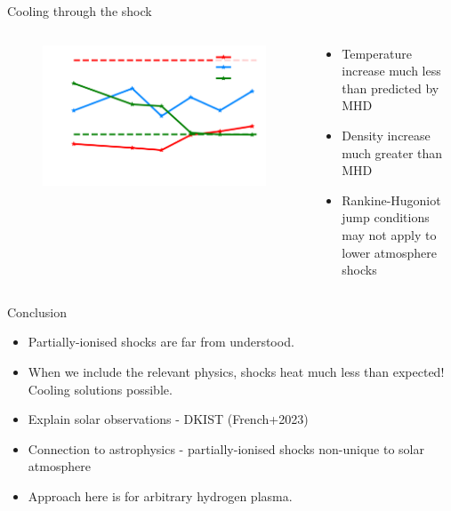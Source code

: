 \documentclass[10pt,aspectratio=169,usenames,dvipsnames]{beamer}
\begin{document}
\begin{frame}{Cooling through the shock}
\begin{columns}
\begin{column}{0.5\textwidth}
\begin{figure}
    \centering
    \includegraphics[width=0.95\linewidth]{2023StAndrewsAstro/Figures/tcompcor_plot.png} \\
\end{figure}
\end{column}
\begin{column}{0.42\textwidth}
\begin{itemize}
    \item Temperature increase much less than predicted by MHD
    \item Density increase much greater than MHD
    \item Rankine-Hugoniot jump conditions may not apply to lower atmosphere shocks
\end{itemize}
\end{column}
\end{columns}
\end{frame}

\begin{frame}{Conclusion}
\begin{itemize}
    \item Partially-ionised shocks are far from understood. 
    \item When we include the relevant physics, shocks heat much less than expected! Cooling solutions possible.
    \item Explain solar observations - DKIST (French+2023)
    \item Connection to astrophysics - partially-ionised shocks non-unique to solar atmosphere
    \item Approach here is for arbitrary hydrogen plasma.
\end{itemize}
\end{frame}
\end{document}
